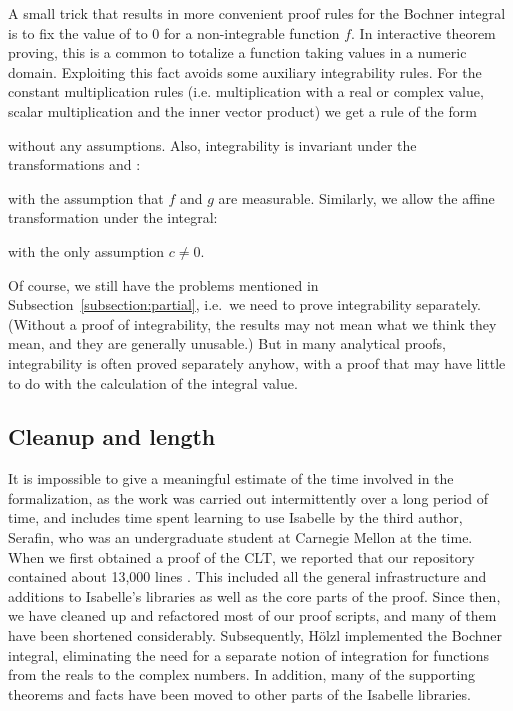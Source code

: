 \documentclass{svjour3}
\begin{document}
A small trick that results in more convenient proof rules for the Bochner integral is to fix the value of  to $0$ for a non-integrable function $f$. In interactive theorem proving, this is a common to totalize a function taking values in a numeric domain. Exploiting this fact avoids some auxiliary integrability rules. For the constant multiplication rules (i.e. multiplication with a real or complex value, scalar multiplication and the inner vector product) we get a rule of the form
\begin{quote}
\end{quote}
without any assumptions. Also, integrability is invariant under the transformations  and :
\begin{quote}
\end{quote}
with the assumption that $f$ and $g$ are measurable. Similarly, we allow the affine transformation under the integral:
\begin{quote}
\end{quote}
with the only assumption $c \not= 0$.

Of course, we still have the problems mentioned in Subsection~\ref{subsection:partial}, i.e.~we need to prove integrability separately. (Without a proof of integrability, the results may not mean what we think they mean, and they are generally unusable.) But in many analytical proofs, integrability is often proved separately anyhow, with a proof that may have little to do with the calculation of the integral value.

\subsection{Cleanup and length}

It is impossible to give a meaningful estimate of the time involved in the formalization, as the work was carried out intermittently over a long period of time, and includes time spent learning to use Isabelle by the third author, Serafin, who was an undergraduate student at Carnegie Mellon at the time. When we first obtained a proof of the CLT, we reported that our repository contained about 13,000 lines \cite{avigad:hoelzl:serafin:14}. This included all the general infrastructure and additions to Isabelle's libraries as well as the core parts of the proof. Since then, we have cleaned up and refactored most of our proof scripts, and many of them have been shortened considerably. Subsequently, H\"olzl implemented the Bochner integral, eliminating the need for a separate notion of integration for functions from the reals to the complex numbers. In addition, many of the supporting theorems and facts have been moved to other parts of the Isabelle libraries.
\end{document}
